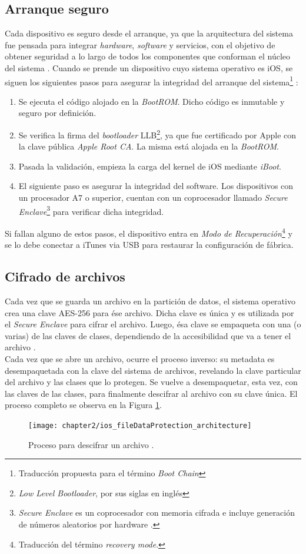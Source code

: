 \subsection{Arranque seguro}\label{fig:ch02:arranque}
Cada dispositivo es seguro desde el arranque, ya que la arquitectura del sistema fue pensada para integrar \textit{hardware}, \textit{software} y servicios, con el objetivo de obtener seguridad a lo largo de todos los componentes que conforman el núcleo del sistema \cite{asg}. Cuando se prende un dispositivo cuyo sistema operativo es iOS, se siguen los siguientes pasos para asegurar la integridad del arranque del sistema\footnote{Traducción propuesta para el término \textit{Boot Chain}} :
\begin{enumerate}
	\item Se ejecuta el código alojado en la \textit{BootROM}. Dicho código es inmutable y seguro por definición.
	\item Se verifica la firma del \textit{bootloader} LLB\footnote{\textit{Low Level Bootloader}, por sus siglas en inglés}, ya que fue certificado por Apple con la clave pública \textit{Apple Root CA}. La misma está alojada en la \textit{BootROM}. 
	\item Pasada la validación, empieza la carga del kernel de iOS mediante \textit{iBoot}.
	\item El siguiente paso es asegurar la integridad del software. Los dispositivos con un procesador A7 o superior, cuentan con un coprocesador llamado \textit{Secure Enclave}\footnote{\textit{Secure Enclave} es un coprocesador con memoria cifrada e incluye generación de números aleatorios por hardware \cite{asg}.} para verificar dicha integridad.
\end{enumerate}
Si fallan alguno de estos pasos, el dispositivo entra en \emph{Modo de Recuperación}\footnote{Traducción del término \textit{recovery mode}.} y se lo debe conectar a iTunes via USB para restaurar la configuración de fábrica.\\
\subsection{Cifrado de archivos}
Cada vez que se guarda un archivo en la partición de datos, el sistema operativo crea una clave AES-256 para ése archivo. Dicha clave es única y es utilizada por el \textit{Secure Enclave} para cifrar el archivo. Luego, ésa clave se empaqueta con una (o varias) de las claves de clases, dependiendo de la accesibilidad que va a tener el archivo \cite{asg}.\\
Cada vez que se abre un archivo, ocurre el proceso inverso: su metadata es desempaquetada con la clave del sistema de archivos, revelando la clave particular del archivo y las clases que lo protegen. Se vuelve a desempaquetar, esta vez, con las claves de las clases, para finalmente descifrar al archivo con su clave única. El proceso completo se observa en la Figura \ref{fig:ch02:dataProtection}.
\begin{figure}[hbtp]
    \centering
    \texttt{[image: chapter2/ios\_fileDataProtection\_architecture]}
    \caption{Proceso para descifrar un archivo \cite{asg}.}
    \label{fig:ch02:dataProtection}
\end{figure}
